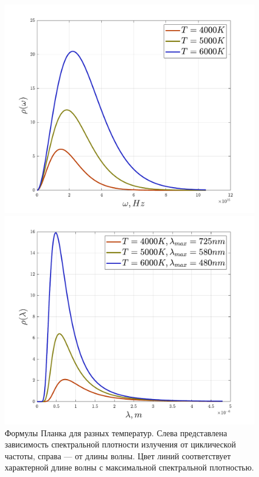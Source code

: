\documentclass[12pt]{article}
\begin{document}
\begin{figure}[h]
    \centering
    \begin{minipage}{0.5\textwidth}
        \centering
        \includegraphics[width=1.0\textwidth]{Seminar_01/pics/pic_04_left.pdf}
    \end{minipage}\hfill
    \begin{minipage}{0.5\textwidth}
        \centering
        \includegraphics[width=1.0\textwidth]{Seminar_01/pics/pic_04_right.pdf}
    \end{minipage}
    \caption{Формулы Планка для разных температур. Слева представлена зависимость спектральной плотности излучения от циклической частоты, справа --- от длины волны. Цвет линий соответствует характерной длине волны с максимальной спектральной плотностью.}
    \label{fig:sem_01_plank_func}
    \vspace{-1mm}
\end{figure}
\end{document}
